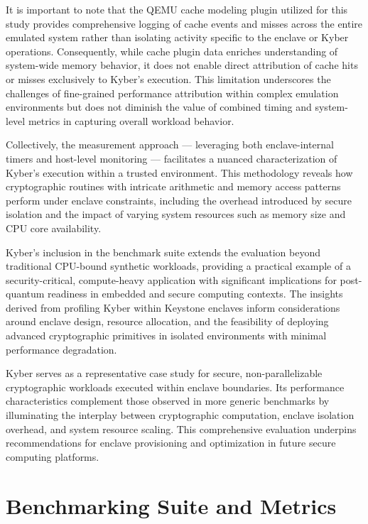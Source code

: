 It is important to note that the QEMU cache modeling plugin \cite{mandour2021cache} utilized for this study provides comprehensive logging of cache events and misses across the entire emulated system rather than isolating activity specific to the enclave or Kyber operations. Consequently, while cache plugin data enriches understanding of system-wide memory behavior, it does not enable direct attribution of cache hits or misses exclusively to Kyber’s execution. This limitation underscores the challenges of fine-grained performance attribution within complex emulation environments but does not diminish the value of combined timing and system-level metrics in capturing overall workload behavior.

Collectively, the measurement approach — leveraging both enclave-internal timers and host-level monitoring — facilitates a nuanced characterization of Kyber’s execution within a trusted environment. This methodology reveals how cryptographic routines with intricate arithmetic and memory access patterns perform under enclave constraints, including the overhead introduced by secure isolation and the impact of varying system resources such as memory size and CPU core availability.

Kyber’s inclusion in the benchmark suite extends the evaluation beyond traditional CPU-bound synthetic workloads, providing a practical example of a security-critical, compute-heavy application with significant implications for post-quantum readiness in embedded and secure computing contexts. The insights derived from profiling Kyber within Keystone enclaves inform considerations around enclave design, resource allocation, and the feasibility of deploying advanced cryptographic primitives in isolated environments with minimal performance degradation.

Kyber serves as a representative case study for secure, non-parallelizable cryptographic workloads executed within enclave boundaries. Its performance characteristics complement those observed in more generic benchmarks by illuminating the interplay between cryptographic computation, enclave isolation overhead, and system resource scaling. This comprehensive evaluation underpins recommendations for enclave provisioning and optimization in future secure computing platforms.


\section{Benchmarking Suite and Metrics}
\label{sec:benchmarking-tools}


